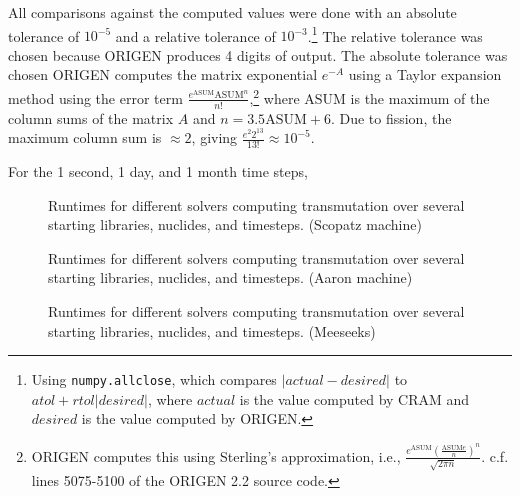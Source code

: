 All comparisons against the computed values were done with an absolute
tolerance of $10^{-5}$ and a relative tolerance of $10^{-3}$.\footnote{Using
  \texttt{numpy.\allowbreak{}allclose}, which compares $|actual -
  desired|$ to $atol + rtol|desired|$,
  where $actual$ is the value computed by CRAM and $desired$ is the
  value computed by ORIGEN.} The relative tolerance was chosen because ORIGEN
produces 4 digits of output. The absolute tolerance was chosen ORIGEN computes
the matrix exponential $e^{-A}$ using a Taylor expansion method using the error term
$\frac{e^{\mathrm{ASUM}}\mathrm{ASUM}^n}{n!}$,\footnote{ORIGEN computes this using
    Sterling's approximation, i.e.,
    $\frac{e^{\mathrm{ASUM}}(\frac{\mathrm{ASUM}e}{n})^n}{\sqrt{2\pi
      n}}$. c.f. lines 5075-5100 of the ORIGEN 2.2 source code.} where
$\mathrm{ASUM}$ is the maximum of the column sums of the matrix $A$ and $n =
3.5\mathrm{ASUM} + 6$. Due to fission, the maximum
column sum is $\approx 2$, giving $\frac{e^{2}2^{13}}{13!}\approx 10^{-5}$.

For the 1 second, 1 day, and 1 month time steps,



\begin{figure}[!ht]
\centering
\resizebox{0.9\textwidth}{!}{}
\caption{Runtimes for different solvers computing transmutation over several starting libraries, nuclides, and timesteps.
(Scopatz machine)}
\label{fig:origen-scopatz}
\end{figure}

\begin{figure}[!ht]
\centering
\resizebox{0.9\textwidth}{!}{}
\caption{Runtimes for different solvers computing transmutation over several starting libraries, nuclides, and timesteps.
 (Aaron machine)}
\label{fig:origen-aaron}
\end{figure}

\begin{figure}[!ht]
\centering
\resizebox{0.9\textwidth}{!}{}
\caption{Runtimes for different solvers computing transmutation over several starting libraries, nuclides, and timesteps.
 (Meeseeks)}
\label{fig:origen-meeseeks}
\end{figure}
